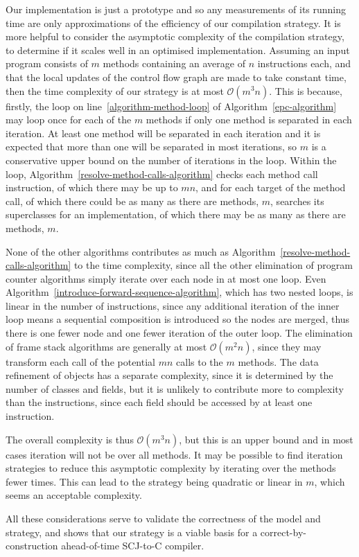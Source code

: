 {Our implementation is just a prototype and so any measurements of its
running time are only approximations of the efficiency of our
compilation strategy.
It is more helpful to consider the asymptotic complexity of the
compilation strategy, to determine if it scales well in an optimised
implementation.
Assuming an input program consists of $m$ methods containing an
average of $n$ instructions each, and that the local updates of the
control flow graph are made to take constant time, then the time
complexity of our strategy is at most $\mathcal{O}(m^3n)$.
This is because, firstly, the loop on line~\ref{algorithm-method-loop}
of Algorithm~\ref{epc-algorithm} may loop once for each of the $m$
methods if only one method is separated in each iteration.
At least one method will be separated in each iteration and it is
expected that more than one will be separated in most iterations, so
$m$ is a conservative upper bound on the number of iterations in the
loop.
Within the loop, Algorithm~\ref{resolve-method-calls-algorithm} checks
each method call instruction, of which there may be up to $mn$, and
for each target of the method call, of which there could be as many as
there are methods, $m$, searches its superclasses for an
implementation, of which there may be as many as there are methods,
$m$.

None of the other algorithms contributes as much as
Algorithm~\ref{resolve-method-calls-algorithm} to the time complexity,
since all the other elimination of program counter algorithms simply
iterate over each node in at most one loop. 
Even Algorithm~\ref{introduce-forward-sequence-algorithm}, which has
two nested loops, is linear in the number of instructions, since any
additional iteration of the inner loop means a sequential composition
is introduced so the nodes are merged, thus there is one fewer node
and one fewer iteration of the outer loop.
The elimination of frame stack algorithms are generally at most
$\mathcal{O}(m^2n)$, since they may transform each call of the
potential $mn$ calls to the $m$ methods.
The data refinement of objects has a separate complexity, since it is
determined by the number of classes and fields, but it is unlikely to
contribute more to complexity than the instructions, since each field
should be accessed by at least one instruction.

The overall complexity is thus $\mathcal{O}(m^3n)$, but this is an
upper bound and in most cases iteration will not be over all methods.
It may be possible to find iteration strategies to reduce this
asymptotic complexity by iterating over the methods fewer times.
This can lead to the strategy being quadratic or linear in $m$, which
seems an acceptable complexity.
}

All these considerations serve to validate the correctness of the
model and strategy, and shows that our strategy is a viable
 basis for a correct-by-construction ahead-of-time
SCJ-to-C compiler.
